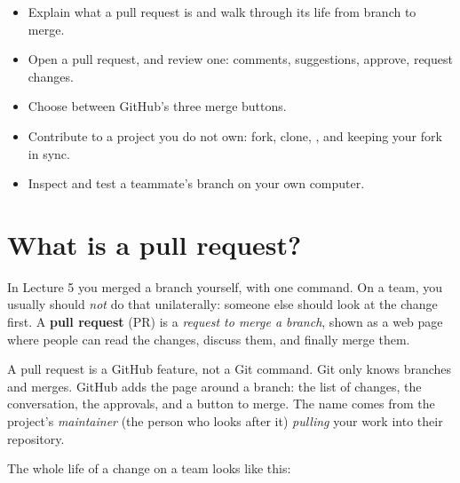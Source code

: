 


\begin{goals}
\begin{itemize}
  \item Explain what a pull request is and walk through its life from branch to merge.
  \item Open a pull request, and review one: comments, suggestions, approve, request changes.
  \item Choose between GitHub's three merge buttons.
  \item Contribute to a project you do not own: fork, clone, , and keeping your fork in sync.
  \item Inspect and test a teammate's branch on your own computer.
\end{itemize}
\end{goals}

\section{What is a pull request?}

In Lecture 5 you merged a branch yourself, with one command. On a team, you usually should \emph{not} do that unilaterally: someone else should look at the change first. A \textbf{pull request} (PR) is a \emph{request to merge a branch}, shown as a web page where people can read the changes, discuss them, and finally merge them.

\begin{keyidea}
A pull request is a GitHub feature, not a Git command. Git only knows branches and merges. GitHub adds the page around a branch: the list of changes, the conversation, the approvals, and a button to merge. The name comes from the project's \emph{maintainer} (the person who looks after it) \emph{pulling} your work into their repository.
\end{keyidea}

The whole life of a change on a team looks like this:

